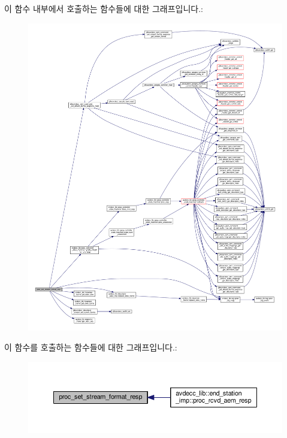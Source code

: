 이 함수 내부에서 호출하는 함수들에 대한 그래프입니다.\+:
\nopagebreak
\begin{figure}[H]
\begin{center}
\leavevmode
\includegraphics[width=350pt]{classavdecc__lib_1_1stream__output__descriptor__imp_af496c7db35b10428eb3587c7f460297a_cgraph}
\end{center}
\end{figure}




이 함수를 호출하는 함수들에 대한 그래프입니다.\+:
\nopagebreak
\begin{figure}[H]
\begin{center}
\leavevmode
\includegraphics[width=350pt]{classavdecc__lib_1_1stream__output__descriptor__imp_af496c7db35b10428eb3587c7f460297a_icgraph}
\end{center}
\end{figure}



